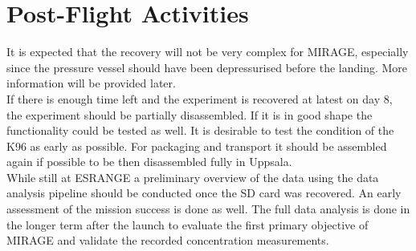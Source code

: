 \clearpage



\section{Post-Flight Activities}
It is expected that the recovery will not be very complex for MIRAGE, especially since the pressure vessel should have been depressurised before the landing. More information will be provided later.\\

If there is enough time left and the experiment is recovered at latest on day 8, the experiment should be partially disassembled. If it is in good shape the functionality could be tested as well. It is desirable to test the condition of the K96 as early as possible. For packaging and transport it should be assembled again if possible to be then disassembled fully in Uppsala.\\ 
While still at ESRANGE a preliminary overview of the data using the data analysis pipeline should be conducted once the SD card was recovered. An early assessment of the mission success is done as well. The full data analysis is done in the longer term after the launch to evaluate the first primary objective of MIRAGE and validate the recorded concentration measurements.



